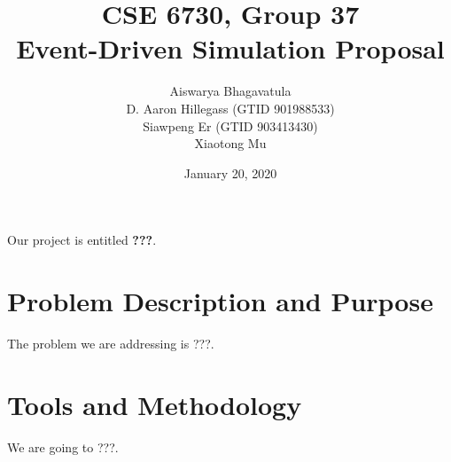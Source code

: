 \documentclass[12pt]{article}
\begin{document}
\title{CSE 6730, Group 37 \\
Event-Driven Simulation Proposal}
\author{
Aiswarya Bhagavatula  \\
D. Aaron Hillegass (GTID 901988533) \\
Siawpeng Er (GTID 903413430) \\
Xiaotong Mu 
}

\date{January 20, 2020}
\maketitle

Our project is entitled \textbf{???}.

\section{Problem Description and Purpose}

The problem we are addressing is ???.

\section{Tools and Methodology}

We are going to ???.
\end{document}
